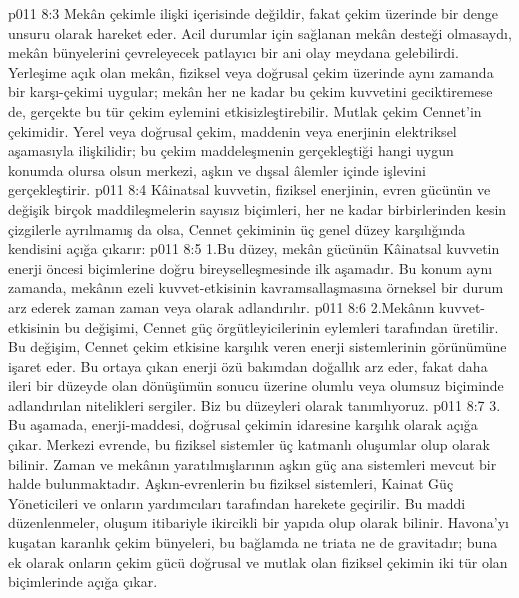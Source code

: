 \vs p011 8:3 Mekân çekimle ilişki içerisinde değildir, fakat çekim üzerinde bir denge unsuru olarak hareket eder. Acil durumlar için sağlanan mekân desteği olmasaydı, mekân bünyelerini çevreleyecek patlayıcı bir ani olay meydana gelebilirdi. Yerleşime açık olan mekân, fiziksel veya doğrusal çekim üzerinde aynı zamanda bir karşı\hyp{}çekimi uygular; mekân her ne kadar bu çekim kuvvetini geciktiremese de, gerçekte bu tür çekim eylemini etkisizleştirebilir. Mutlak çekim Cennet’in çekimidir. Yerel veya doğrusal çekim, maddenin veya enerjinin elektriksel aşamasıyla ilişkilidir; bu çekim maddeleşmenin gerçekleştiği hangi uygun konumda olursa olsun merkezi, aşkın ve dışsal âlemler içinde işlevini gerçekleştirir.
\vs p011 8:4 Kâinatsal kuvvetin, fiziksel enerjinin, evren gücünün ve değişik birçok maddileşmelerin sayısız biçimleri, her ne kadar birbirlerinden kesin çizgilerle ayrılmamış da olsa, Cennet çekiminin üç genel düzey karşılığında kendisini açığa çıkarır:
\vs p011 8:5 1.\bibnobreakspace {}Bu düzey, mekân gücünün Kâinatsal kuvvetin enerji öncesi biçimlerine doğru bireyselleşmesinde ilk aşamadır. Bu konum aynı zamanda, mekânın ezeli kuvvet\hyp{}etkisinin kavramsallaşmasına örneksel bir durum arz ederek zaman zaman  veya  olarak adlandırılır.
\vs p011 8:6 2.\bibnobreakspace {}Mekânın kuvvet\hyp{}etkisinin bu değişimi, Cennet güç örgütleyicilerinin eylemleri tarafından üretilir. Bu değişim, Cennet çekim etkisine karşılık veren enerji sistemlerinin görünümüne işaret eder. Bu ortaya çıkan enerji özü bakımdan doğallık arz eder, fakat daha ileri bir düzeyde olan dönüşümün sonucu üzerine olumlu veya olumsuz biçiminde adlandırılan nitelikleri sergiler. Biz bu düzeyleri  olarak tanımlıyoruz.
\vs p011 8:7 3.\bibnobreakspace {} Bu aşamada, enerji\hyp{}maddesi, doğrusal çekimin idaresine karşılık olarak açığa çıkar. Merkezi evrende, bu fiziksel sistemler üç katmanlı oluşumlar olup  olarak bilinir. Zaman ve mekânın yaratılmışlarının aşkın güç ana sistemleri mevcut bir halde bulunmaktadır. Aşkın\hyp{}evrenlerin bu fiziksel sistemleri, Kainat Güç Yöneticileri ve onların yardımcıları tarafından harekete geçirilir. Bu maddi düzenlenmeler, oluşum itibariyle ikircikli bir yapıda olup  olarak bilinir. Havona’yı kuşatan karanlık çekim bünyeleri, bu bağlamda ne triata ne de gravitadır; buna ek olarak onların çekim gücü doğrusal ve mutlak olan fiziksel çekimin iki tür olan biçimlerinde açığa çıkar.
